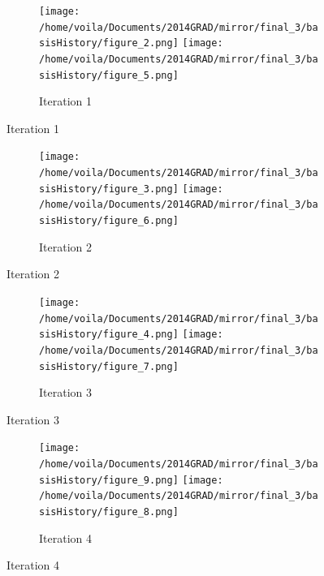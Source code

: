\begin{figure}[htbp]\begin{center}
    \begin{subfigure}[t]{1.\textwidth}
        \centering
        \texttt{[image: /home/voila/Documents/2014GRAD/mirror/final\_3/basisHistory/figure\_2.png]}
        \texttt{[image: /home/voila/Documents/2014GRAD/mirror/final\_3/basisHistory/figure\_5.png]}
        \caption{Iteration 1}
        \label{fig: basis history 1}
    \end{subfigure}
\end{center}\end{figure}
\begin{figure}\ContinuedFloat
\begin{center}
    \begin{subfigure}[t]{1.\textwidth}     
        \centering
        \texttt{[image: /home/voila/Documents/2014GRAD/mirror/final\_3/basisHistory/figure\_3.png]}
        \texttt{[image: /home/voila/Documents/2014GRAD/mirror/final\_3/basisHistory/figure\_6.png]}
        \caption{Iteration 2}
        \label{fig: basis history 2}
    \end{subfigure}
\end{center}
\end{figure}
\begin{figure}\ContinuedFloat
\begin{center}
    \begin{subfigure}[t]{1.\textwidth}
        \centering
        \texttt{[image: /home/voila/Documents/2014GRAD/mirror/final\_3/basisHistory/figure\_4.png]}
        \texttt{[image: /home/voila/Documents/2014GRAD/mirror/final\_3/basisHistory/figure\_7.png]}
        \caption{Iteration 3}
        \label{fig: basis history 3}
    \end{subfigure}
\end{center}
\end{figure}
\begin{figure}\ContinuedFloat
\begin{center}
    \begin{subfigure}[t]{1.\textwidth}
        \centering
        \texttt{[image: /home/voila/Documents/2014GRAD/mirror/final\_3/basisHistory/figure\_9.png]}
        \texttt{[image: /home/voila/Documents/2014GRAD/mirror/final\_3/basisHistory/figure\_8.png]}
        \caption{Iteration 4}
        \label{fig: basis history 4}
    \end{subfigure}
\end{center}
\end{figure}
